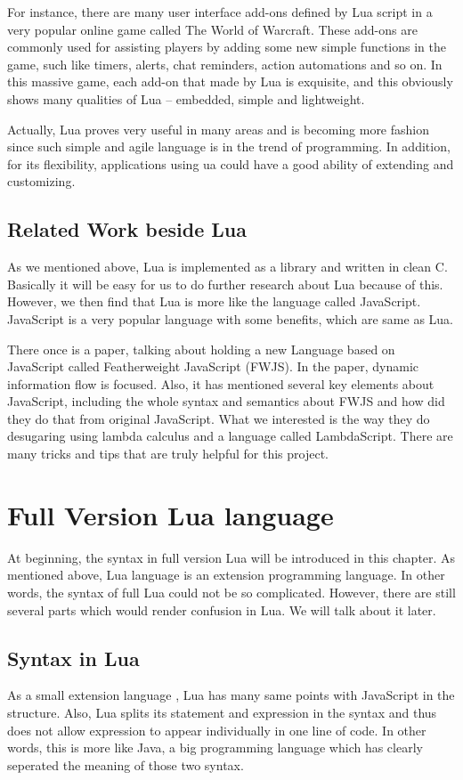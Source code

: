 \documentclass{article}
\begin{document}
For instance, there are many user interface add-ons defined by Lua script in a very popular online game called The World of Warcraft\cite{wowLua}. These add-ons are commonly used for assisting players by adding some new simple functions in the game, such like timers, alerts, chat reminders, action automations and so on. In this massive game, each add-on that made by Lua is exquisite, and this obviously shows many qualities of Lua -- embedded, simple and lightweight.

Actually, Lua proves very useful in many areas and is becoming more fashion since such simple and agile language is in the trend of programming. In addition, for its flexibility, applications using ua could have a good ability of extending and customizing.

\subsection{Related Work beside Lua}
As we mentioned above, Lua is implemented as a library and written in clean C. Basically it will be easy for us to do further research about Lua because of this. However, we then find that Lua is more like the language called JavaScript. JavaScript is a very popular language with some benefits, which are same as Lua.

There once is a paper, talking about holding a new Language based on JavaScript called Featherweight JavaScript (FWJS). In the paper, dynamic information flow is focused. Also, it has mentioned several key elements about JavaScript, including the whole syntax and semantics about FWJS and how did they do that from original JavaScript. What we interested is the way they do desugaring using lambda calculus and a language called LambdaScript. There are many tricks and tips that are truly helpful for this project.

\section{Full Version Lua language}
At beginning, the syntax in full version Lua will be introduced in this chapter. As mentioned above, Lua language is an extension programming language. In other words, the syntax of full Lua could not be so complicated. However, there are still several parts which would render confusion in Lua. We will talk about it later.  

\subsection{Syntax in Lua}
As a small extension language \cite{1}, Lua has many same points with JavaScript in the structure. Also, Lua splits its statement and expression in the syntax and thus does not allow expression to appear individually in one line of code. In other words, this is more like Java, a big programming language which has clearly seperated the meaning of those two syntax.
\end{document}

